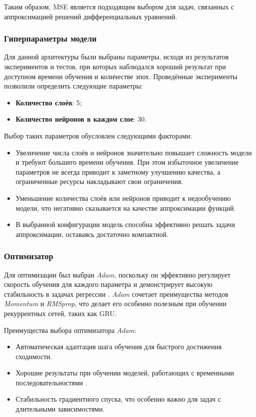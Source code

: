 Таким образом, MSE является подходящим выбором для задач, связанных с аппроксимацией решений дифференциальных уравнений.

\subsubsection{Гиперпараметры модели}

Для данной архитектуры были выбраны параметры, исходя из результатов экспериментов и тестов, при которых наблюдался хороший результат при доступном времени обучения и количестве эпох. Проведённые эксперименты позволили определить следующие параметры:
\begin{itemize}
    \item \textbf{Количество слоёв}: 5;
    \item \textbf{Количество нейронов в каждом слое}: 30.
\end{itemize}

Выбор таких параметров обусловлен следующими факторами:
\begin{itemize}
    \item Увеличение числа слоёв и нейронов значительно повышает сложность модели и требуют большего времени обучения. При этом избыточное увеличение параметров не всегда приводит к заметному улучшению качества, а ограниченные ресурсы накладывают свои ограничения.
    \item Уменьшение количества слоёв или нейронов приводит к недообучению модели, что негативно сказывается на качестве аппроксимации функций.
    \item В выбранной конфигурации модель способна эффективно решать задачи аппроксимации, оставаясь достаточно компактной.
\end{itemize}

\subsubsection{Оптимизатор}

Для оптимизации был выбран \textit{Adam}, поскольку он эффективно регулирует скорость обучения для каждого параметра и демонстрирует высокую стабильность в задачах регрессии \cite{HOML}. \textit{Adam} сочетает преимущества методов \textit{Momentum} и \textit{RMSprop}, что делает его особенно полезным при обучении рекуррентных сетей, таких как GRU.

Преимущества выбора оптимизатора \textit{Adam}:
\begin{itemize}
    \item Автоматическая адаптация шага обучения для быстрого достижения сходимости.
    \item Хорошие результаты при обучении моделей, работающих с временными последовательностями \cite{adam}.
    \item Стабильность градиентного спуска, что особенно важно для задач с длительными зависимостями.
\end{itemize}

